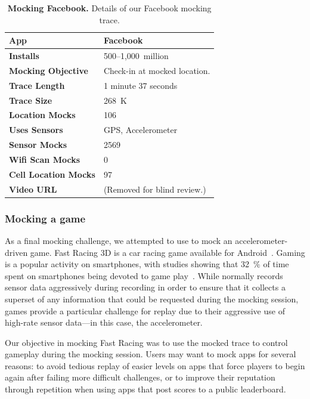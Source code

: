 \begin{table}[t]
\begin{tabularx}{3.33in}{lX}
\textbf{App} & Facebook \\ \toprule
\textbf{Installs} & 500--1,000~million \\
\textbf{Mocking Objective} & Check-in at mocked location. \\
  \midrule
\textbf{Trace Length} & 1 minute 37 seconds \\
\textbf{Trace Size} & 268~K \\
\textbf{Location Mocks} & 106 \\
\textbf{Uses Sensors} & GPS, Accelerometer \\
\textbf{Sensor Mocks} & 2569 \\
\textbf{Wifi Scan Mocks} & 0 \\
\textbf{Cell Location Mocks} & 97 \\
\textbf{Video URL} & (Removed for blind review.) \\

\end{tabularx}

\caption{\textbf{Mocking Facebook.} Details of our Facebook mocking trace.}

\label{table-mocking-facebook}

\end{table}

\subsubsection{Mocking a game}

As a final mocking challenge, we attempted to use \PocketMocker{} to mock an
accelerometer-driven game. Fast Racing 3D is a car racing game available for
Android~\cite{fastracing-playstore-url}. Gaming is a popular activity on
smartphones, with studies showing that 32~\% of time spent on smartphones
being devoted to game play~\cite{flurry-smartphoneuse}. While \PocketMocker{}
normally records sensor data aggressively during recording in order to ensure
that it collects a superset of any information that could be requested during
the mocking session, games provide a particular challenge for replay due to
their aggressive use of high-rate sensor data---in this case, the
accelerometer.

Our objective in mocking Fast Racing was to use the mocked trace to control
gameplay during the mocking session. Users may want to mock apps for several
reasons: to avoid tedious replay of easier levels on apps that force players
to begin again after failing more difficult challenges, or to improve their
reputation through repetition when using apps that post scores to a public
leaderboard.

